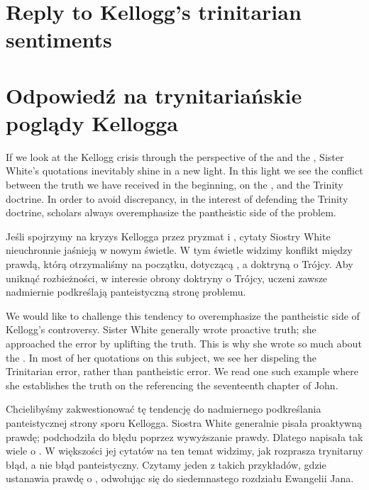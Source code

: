 \chapter{Reply to Kellogg’s trinitarian sentiments}


\chapter{Odpowiedź na trynitariańskie poglądy Kellogga}


If we look at the Kellogg crisis through the perspective of the  and the , Sister White’s quotations inevitably shine in a new light. In this light we see the conflict between the truth we have received in the beginning, on the , and the Trinity doctrine. In order to avoid discrepancy, in the interest of defending the Trinity doctrine, scholars always overemphasize the pantheistic side of the problem.


Jeśli spojrzymy na kryzys Kellogga przez pryzmat  i , cytaty Siostry White nieuchronnie jaśnieją w nowym świetle. W tym świetle widzimy konflikt między prawdą, którą otrzymaliśmy na początku, dotyczącą , a doktryną o Trójcy. Aby uniknąć rozbieżności, w interesie obrony doktryny o Trójcy, uczeni zawsze nadmiernie podkreślają panteistyczną stronę problemu.


We would like to challenge this tendency to overemphasize the pantheistic side of Kellogg’s controversy. Sister White generally wrote proactive truth; she approached the error by uplifting the truth. This is why she wrote so much about the . In most of her quotations on this subject, we see her dispeling the Trinitarian error, rather than pantheistic error. We read one such example where she establishes the truth on the  referencing the seventeenth chapter of John.


Chcielibyśmy zakwestionować tę tendencję do nadmiernego podkreślania panteistycznej strony sporu Kellogga. Siostra White generalnie pisała proaktywną prawdę; podchodziła do błędu poprzez wywyższanie prawdy. Dlatego napisała tak wiele o . W większości jej cytatów na ten temat widzimy, jak rozprasza trynitarny błąd, a nie błąd panteistyczny. Czytamy jeden z takich przykładów, gdzie ustanawia prawdę o , odwołując się do siedemnastego rozdziału Ewangelii Jana.


